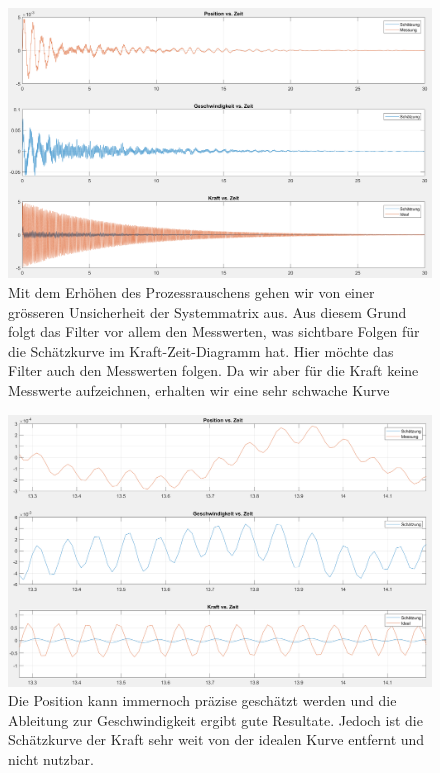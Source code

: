 \begin{figure}
	\begin{center}
		\includegraphics[width=\linewidth,keepaspectratio]{papers/erdbeben/Prozessrauschen_geaendert.PNG}
		\caption{Mit dem Erhöhen des Prozessrauschens gehen wir von einer grösseren Unsicherheit der Systemmatrix aus. Aus diesem Grund folgt das Filter vor allem den Messwerten, was sichtbare Folgen für die Schätzkurve im Kraft-Zeit-Diagramm hat. Hier möchte das Filter auch den Messwerten folgen. Da wir aber für die Kraft keine Messwerte aufzeichnen, erhalten wir eine sehr schwache Kurve}
    \label{erdbeben:fig:prozessrauschen-geaendert}
	\end{center}
\end{figure}

\begin{figure}
	\begin{center}
		\includegraphics[width=\linewidth,keepaspectratio]{papers/erdbeben/Prozessrauschen_geaendert_zoom.PNG}
		\caption{Die Position kann immernoch präzise geschätzt werden und die Ableitung zur Geschwindigkeit ergibt gute Resultate. Jedoch ist die Schätzkurve der Kraft sehr weit von der idealen Kurve entfernt und nicht nutzbar.}
		\label{erdbeben:fig:prozessrauschen-geaendert-zoom}
	\end{center}
\end{figure}

